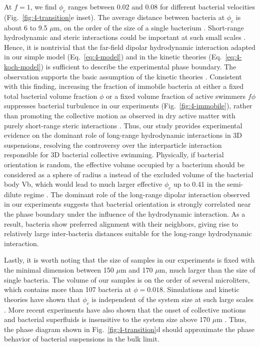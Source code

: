 At $f = 1$, we find $\phi_c$ ranges between 0.02 and 0.08 for different bacterial velocities (Fig.~\ref{fig:4-transition}e inset). The average distance between bacteria at $\phi_c$ is about 6 to 9.5 $\mu$m, on the order of the size of a single bacterium \cite{Berg2004}. Short-range hydrodynamic and steric interactions could be important at such small scales \cite{Aranson2007, Ezhilan2013}. Hence, it is nontrivial that the far-field dipolar hydrodynamic interaction adapted in our simple model (Eq.~\ref{eq:4-model}) and in the kinetic theories (Eq.~\ref{eq:4-koch-model}) is sufficient to describe the experimental phase boundary.
The observation supports the basic assumption of the kinetic theories \cite{Koch2011, Saintillan2015}. Consistent with this finding, increasing the fraction of immobile bacteria at either a fixed total bacterial volume fraction $\phi$ or a fixed volume fraction of active swimmers $f\phi$ suppresses bacterial turbulence in our experiments (Fig.~\ref{fig:4-immobile}), rather than promoting the collective motion as observed in dry active matter with purely short-range steric interactions \cite{Kumar2014}. Thus, our study provides experimental evidence on the dominant role of long-range hydrodynamic interactions in 3D suspensions, resolving the controversy over the interparticle interaction responsible for 3D bacterial collective swimming. Physically, if bacterial orientation is random, the effective volume occupied by a bacterium should be considered as a sphere of radius a instead of the excluded volume of the bacterial body Vb, which would lead to much larger effective $\phi_c$ up to 0.41 in the semi-dilute regime \cite{Cisneros2011}. The dominant role of the long-range dipolar interaction observed in our
experiments suggests that bacterial orientation is strongly correlated near the phase boundary under the influence of the hydrodynamic interaction. As a result, bacteria show preferred alignment with their neighbors, giving rise to relatively large inter-bacteria distances suitable for the long-range hydrodynamic interaction.

Lastly, it is worth noting that the size of samples in our experiments is fixed with the minimal dimension between 150 $\mu$m and 170 $\mu$m, much larger than the size of single bacteria. The volume of our samples is on the order of several microliters, which contains more than 107 bacteria at $\phi = 0.018$. Simulations and kinetic theories have shown that $\phi_c$ is independent of the system size at such large scales \cite{Stenhammar2017}. More recent experiments have also shown that the onset of collective motions and bacterial superfluids is insensitive to the system size above 170 $\mu$m \cite{Martinez2020}. Thus, the phase diagram shown in Fig.~\ref{fig:4-transition}d should approximate the phase behavior of bacterial suspensions in the bulk limit.


